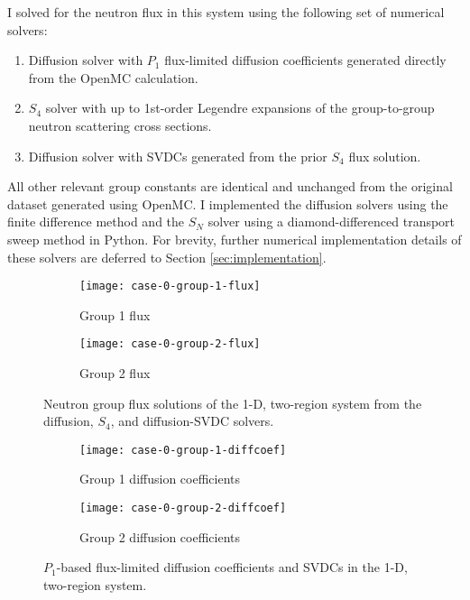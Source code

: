 I solved for the neutron flux in this system using the following set of numerical solvers:
%
\begin{enumerate}
  \item Diffusion solver with $P_1$ flux-limited diffusion coefficients generated directly from the
    OpenMC calculation.
  \item $S_4$ solver with up to 1st-order Legendre expansions of the group-to-group neutron
    scattering cross sections.
  \item Diffusion solver with \glspl{SVDC} generated from the prior $S_4$ flux solution.
\end{enumerate}
%
All other relevant group constants are identical and unchanged from the original dataset generated
using OpenMC. I implemented the diffusion solvers using the finite difference method and the $S_N$
solver using a diamond-differenced transport sweep method in Python. For brevity, further numerical
implementation details of these solvers are deferred to Section \ref{sec:implementation}.

\begin{figure}[htb!]
  \centering
  \begin{subfigure}[b]{.49\textwidth}
    \centering
    \texttt{[image: case-0-group-1-flux]}
    \caption{Group 1 flux}
    \label{fig:c0g1flux}
  \end{subfigure}
  \hfill
  \begin{subfigure}[b]{.49\textwidth}
    \centering
    \texttt{[image: case-0-group-2-flux]}
    \caption{Group 2 flux}
    \label{fig:c0g2flux}
  \end{subfigure}
  \caption{Neutron group flux solutions of the 1-D, two-region system from the diffusion, $S_4$,
    and diffusion-\gls{SVDC} solvers.}
  \label{fig:c0flux}
\end{figure}
%
\begin{figure}[htb!]
  \centering
  \begin{subfigure}[b]{.49\textwidth}
    \centering
    \texttt{[image: case-0-group-1-diffcoef]}
    \caption{Group 1 diffusion coefficients}
    \label{fig:c0g1diffcoef}
  \end{subfigure}
  \hfill
  \begin{subfigure}[b]{.49\textwidth}
    \centering
    \texttt{[image: case-0-group-2-diffcoef]}
    \caption{Group 2 diffusion coefficients}
    \label{fig:c0g2diffcoef}
  \end{subfigure}
  \caption{$P_1$-based flux-limited diffusion coefficients and \glspl{SVDC} in the 1-D, two-region
  system.}
  \label{fig:c0flux}
\end{figure}

